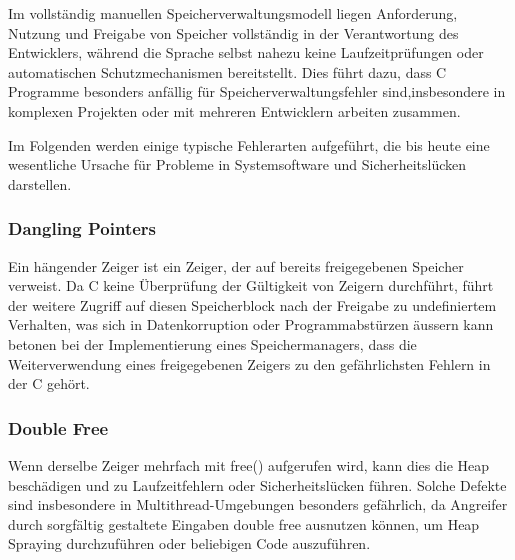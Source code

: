 Im vollständig manuellen Speicherverwaltungsmodell liegen Anforderung, Nutzung und 
Freigabe von Speicher vollständig in der Verantwortung des Entwicklers, während die 
Sprache selbst nahezu keine Laufzeitprüfungen oder automatischen Schutzmechanismen 
bereitstellt. Dies führt dazu, dass C Programme besonders anfällig für 
Speicherverwaltungsfehler sind,insbesondere in komplexen Projekten oder mit 
mehreren Entwicklern arbeiten zusammen.

Im Folgenden werden einige typische Fehlerarten aufgeführt, die bis heute eine 
wesentliche Ursache für Probleme in Systemsoftware und Sicherheitslücken darstellen.

\subsubsection{Dangling Pointers}
\label{sec:Dangling Pointers}
Ein hängender Zeiger ist ein Zeiger, der auf bereits freigegebenen Speicher verweist. 
Da C keine Überprüfung der Gültigkeit von Zeigern durchführt, führt der weitere Zugriff 
auf diesen Speicherblock nach der Freigabe zu undefiniertem Verhalten, was sich in 
Datenkorruption oder Programmabstürzen äussern kann betonen bei der Implementierung eines Speichermanagers, dass die Weiterverwendung eines 
freigegebenen Zeigers zu den gefährlichsten Fehlern in der C gehört\autocite{TheCProgrammingLaunguage}.
\begin{figure}[htp]
    \centering
    
    \label{fig:dangling_pointer_in_c}
\end{figure}

\subsubsection{Double Free}
\label{sec:Double Free}
Wenn derselbe Zeiger mehrfach mit free() aufgerufen wird, kann dies die Heap
beschädigen und zu Laufzeitfehlern oder Sicherheitslücken führen. Solche Defekte 
sind insbesondere in Multithread-Umgebungen besonders gefährlich, da Angreifer 
durch sorgfältig gestaltete Eingaben double free ausnutzen können, 
um Heap Spraying durchzuführen oder beliebigen Code auszuführen.
\begin{figure}[htp]
    \centering
    
    \label{fig:double_free_in_c}
\end{figure}

